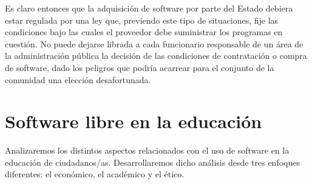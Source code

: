 Es claro entonces que la adquisición de software por parte del Estado debiera estar regulada por una ley que, previendo este tipo de situaciones, fije las condiciones bajo las cuales el proveedor debe suministrar los programas en cuestión. No puede dejarse librada a cada funcionario responsable de un área de la administración pública la decisión de las condiciones de contratación o compra de software, dado los peligros que podría acarrear para el conjunto de la comunidad una elección desafortunada.


\section{Software libre en la educación}

Analizaremos los distintos aspectos relacionados con el uso de software en la educación de ciudadanos/as. Desarrollaremos dicho análisis desde tres enfoques diferentes: el económico, el académico y el ético.

